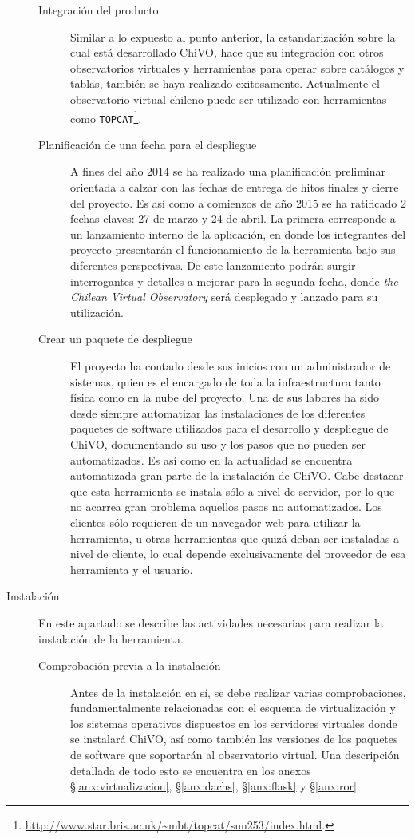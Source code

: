 \begin{description}
\begin{description}
			\item [Integración del producto] Similar a lo expuesto al punto anterior, la estandarización sobre la cual está desarrollado ChiVO, hace que su integración con otros observatorios virtuales y herramientas para operar sobre catálogos y tablas, tambi\'en se haya realizado exitosamente. Actualmente el observatorio virtual chileno puede ser utilizado con herramientas como \verb;TOPCAT;\footnote{\url{http://www.star.bris.ac.uk/~mbt/topcat/sun253/index.html}.}.
			\item [Planificación de una fecha para el despliegue] A fines del año 2014 se ha realizado una planificación preliminar orientada a calzar con las fechas de entrega de hitos finales y cierre del proyecto. Es así como a comienzos de año 2015 se ha ratificado 2 fechas claves: 27 de marzo y 24 de abril. La primera corresponde a un lanzamiento interno de la aplicación, en donde los integrantes del proyecto presentarán el funcionamiento de la herramienta bajo sus diferentes perspectivas. De este lanzamiento podrán surgir interrogantes y detalles a mejorar para la segunda fecha, donde \emph{the Chilean Virtual Observatory} será desplegado y lanzado para su utilización. 
			\item [Crear un paquete de despliegue] El proyecto ha contado desde sus inicios con un administrador de sistemas, quien es el encargado de toda la infraestructura tanto física como en la nube del proyecto. Una de sus labores ha sido desde siempre automatizar las instalaciones de los diferentes paquetes de software utilizados para el desarrollo y despliegue de ChiVO, documentando su uso y los pasos que no pueden ser automatizados. Es así como en la actualidad se encuentra automatizada gran parte de la instalación de ChiVO. Cabe destacar que esta herramienta se instala sólo a nivel de servidor, por lo que no acarrea gran problema aquellos pasos no automatizados. Los clientes sólo requieren de un navegador web para utilizar la herramienta, u otras herramientas que quizá deban ser instaladas a nivel de cliente, lo cual depende exclusivamente del proveedor de esa herramienta y el usuario.
		\end{description}
	\item [Instalación] En este apartado se describe las actividades necesarias para realizar la instalación de la herramienta.
		\begin{description}
			\item [Comprobación previa a la instalación] Antes de la instalación en sí, se debe realizar varias comprobaciones, fundamentalmente relacionadas con el esquema de virtualización y los sistemas operativos dispuestos en los servidores virtuales donde se instalará ChiVO, así como tambi\'en las versiones de los paquetes de software que soportarán al observatorio virtual. Una descripción detallada de todo esto se encuentra en los anexos \S\ref{anx:virtualizacion}, \S\ref{anx:dachs}, \S\ref{anx:flask} y \S\ref{anx:ror}.

\end{description}
\end{description}
